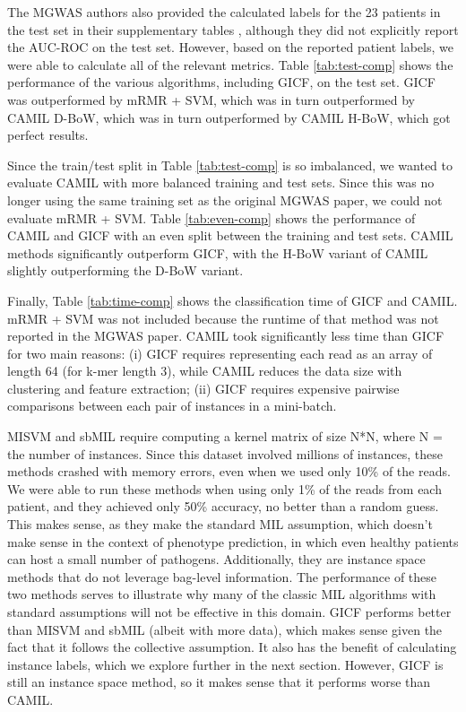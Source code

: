 The MGWAS authors also provided the calculated labels for the 23 patients in the test set in their supplementary tables \cite{qin041012}, although they did not explicitly report the AUC-ROC on the test set. However, based on the reported patient labels, we were able to calculate all of the relevant metrics. Table \ref{tab:test-comp} shows the performance of the various algorithms, including GICF, on the test set. GICF was outperformed by mRMR + SVM, which was in turn outperformed by CAMIL D-BoW, which was in turn outperformed by CAMIL H-BoW, which got perfect results.

Since the train/test split in Table \ref{tab:test-comp} is so imbalanced, we wanted to evaluate CAMIL with more balanced training and test sets. Since this was no longer using the same training set as the original MGWAS paper, we could not evaluate mRMR + SVM. Table \ref{tab:even-comp} shows the performance of CAMIL and GICF with an even split between the training and test sets. CAMIL methods significantly outperform GICF, with the H-BoW variant of CAMIL slightly outperforming the D-BoW variant. 

Finally, Table \ref{tab:time-comp} shows the classification time of GICF and CAMIL. mRMR + SVM was not included because the runtime of that method was not reported in the MGWAS paper. CAMIL took significantly less time than GICF for two main reasons: (i) GICF requires representing each read as an array of length 64 (for k-mer length 3), while CAMIL reduces the data size with clustering and feature extraction; (ii) GICF requires expensive pairwise comparisons between each pair of instances in a mini-batch.

MISVM and sbMIL require computing a kernel matrix of size N*N, where N = the number of instances. Since this dataset involved millions of instances, these methods crashed with memory errors, even when we used only 10\% of the reads. We were able to run these methods when using only 1\% of the reads from each patient, and they achieved only 50\% accuracy, no better than a random guess. This makes sense, as they make the standard MIL assumption, which doesn't make sense in the context of phenotype prediction, in which even healthy patients can host a small number of pathogens. Additionally, they are instance space methods that do not leverage bag-level information. The performance of these two methods serves to illustrate why many of the classic MIL algorithms with standard assumptions will not be effective in this domain. GICF performs better than MISVM and sbMIL (albeit with more data), which makes sense given the fact that it follows the collective assumption. It also has the benefit of calculating instance labels, which we explore further in the next section. However, GICF is still an instance space method, so it makes sense that it performs worse than CAMIL.

